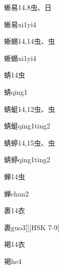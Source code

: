 \begin{Entry}{蜥易}{14,8}{⾍、⽇}
  \begin{Phonetics}{蜥易}{xi1yi4}
  \end{Phonetics}
\end{Entry}

\begin{Entry}{蜥蜴}{14,14}{⾍、⾍}
  \begin{Phonetics}{蜥蜴}{xi1yi4}
  \end{Phonetics}
\end{Entry}

\begin{Entry}{蜻}{14}{⾍}
  \begin{Phonetics}{蜻}{qing1}
  \end{Phonetics}
\end{Entry}

\begin{Entry}{蜻蜓}{14,12}{⾍、⾍}
  \begin{Phonetics}{蜻蜓}{qing1ting2}
  \end{Phonetics}
\end{Entry}

\begin{Entry}{蜻蝏}{14,15}{⾍、⾍}
  \begin{Phonetics}{蜻蝏}{qing1ting2}
  \end{Phonetics}
\end{Entry}

\begin{Entry}{蝉}{14}{⾍}
  \begin{Phonetics}{蝉}{chan2}
  \end{Phonetics}
\end{Entry}

\begin{Entry}{裹}{14}{⾐}
  \begin{Phonetics}{裹}{guo3}[][HSK 7-9]
  \end{Phonetics}
\end{Entry}

\begin{Entry}{褐}{14}{⾐}
  \begin{Phonetics}{褐}{he4}
  \end{Phonetics}
\end{Entry}

